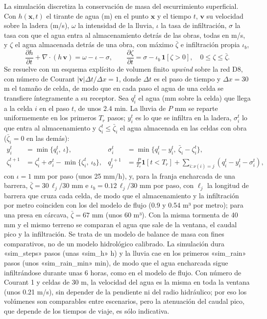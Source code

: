 La simulación discretiza la conservación de masa del escurrimiento superficial. Con $h(\mathbf x,t)$ el tirante de agua (m) en el punto $\mathbf x$ y el tiempo $t$, $\mathbf v$ su velocidad sobre la ladera (m/s), $\omega$ la intensidad de la lluvia, $\iota$ la tasa de infiltración, $\sigma$ la tasa con que el agua entra al almacenamiento detrás de las obras, todas en m/s, y $\zeta$ el agua almacenada detrás de una obra, con máximo $\bar\zeta$ e infiltración propia $\iota_b$,
\begin{equation}
\frac{\partial h}{\partial t}+\nabla\!\cdot\!\left(h\,\mathbf v\right)= \omega-\iota-\sigma ,\qquad \frac{\partial \zeta}{\partial t}=\sigma-\iota_b\,\mathbf 1[\zeta>0],\quad 0\le \zeta\le \bar \zeta .
\end{equation}
Se resuelve con un esquema explícito de volumen finito \emph{upwind} sobre la red D8, con número de Courant $\lvert\mathbf v\rvert\Delta t/\Delta x=1$, donde $\Delta t$ es el paso de tiempo y $\Delta x=30$ m el tamaño de celda, de modo que en cada paso el agua de una celda se transfiere íntegramente a su receptor. Sea $q_i^t$ el agua (mm sobre la celda) que llega a la celda $i$ en el paso $t$, de unos 2.4 min. La lluvia de $P$ mm se reparte uniformemente en los primeros $T_r$ pasos; $y_i^t$ es lo que se infiltra en la ladera, $\sigma_i^t$ lo que entra al almacenamiento y $\zeta_i^t\le \bar\zeta_i$ el agua almacenada en las celdas con obra ($\bar\zeta_i=0$ en las demás):
\begin{equation}
\begin{aligned}
y_i^t &= \min\{q_i^t,\ \iota\}, & \sigma_i^t &= \min\{q_i^t-y_i^t,\ \bar \zeta_i-\zeta_i^t\},\\
\zeta_i^{t+1} &= \zeta_i^t+\sigma_i^t-\min\{\zeta_i^t,\ \iota_b\}, & q_{j}^{t+1} &= \frac{P}{T_r}\mathbf 1[t<T_r]+\sum_{i:\nu(i)=j}\left(q_i^t-y_i^t-\sigma_i^t\right),
\end{aligned}
\end{equation}
con $\iota=1$ mm por paso (unos 25 mm/h), y, para la franja encharcada de una barrera, $\bar \zeta=30\,\ell_j/30$ mm e $\iota_b=0.12\,\ell_j/30$ mm por paso, con $\ell_j$ la longitud de barrera que cruza cada celda, de modo que el almacenamiento y la infiltración por metro coinciden con los del modelo de flujo (0.9 y 0.54 m³ por metro); para una presa en cárcava, $\bar \zeta=67$ mm (unos 60 m³). Con la misma tormenta de 40 mm y el mismo terreno se comparan el agua que sale de la ventana, el caudal pico y la infiltración. Se trata de un modelo de balance de masa con fines comparativos, no de un modelo hidrológico calibrado. La simulación dura «sim_steps» pasos (unas «sim_h» h) y la lluvia cae en los primeros «sim_rain» pasos (unos «sim_rain_min» min), de modo que el agua encharcada sigue infiltrándose durante unas 6 horas, como en el modelo de flujo. Con número de Courant 1 y celdas de 30 m, la velocidad del agua es la misma en toda la ventana (unos 0.21 m/s), sin depender de la pendiente ni del radio hidráulico; por eso los volúmenes son comparables entre escenarios, pero la atenuación del caudal pico, que depende de los tiempos de viaje, es sólo indicativa.

